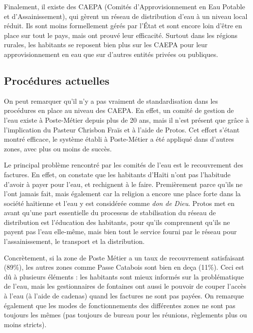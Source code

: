 \documentclass{EPL-master-thesis-covers-FR}
\begin{document}
				Finalement, il existe des CAEPA (Comités d’Approvisionnement en Eau Potable et d'Assainissement), qui gèrent un réseau de distribution d'eau à un niveau local réduit. Ils sont moins formellement gérés par l'\'Etat et sont encore loin d'être en place sur tout le pays, mais ont prouvé leur efficacité. Surtout dans les régions rurales, les habitants se reposent bien plus sur les CAEPA pour leur approvisionnement en eau que sur d'autres entités privées ou publiques.



			\subsection*{Procédures actuelles}
				\label{sec:procedures_actuelles}

				On peut remarquer qu'il n'y a pas vraiment de standardisation dans les procédures en place au niveau des CAEPA. En effet, un comité de gestion de l'eau existe à Poste-Métier depuis plus de 20 ans, mais il n'est présent que grâce à l'implication du Pasteur Chrisbon Fraïs et à l'aide de Protos. Cet effort s'étant montré efficace, le système établi à Poste-Métier a été appliqué dans d'autres zones, avec plus ou moins de succès.

				Le principal problème rencontré par les comités de l'eau est le recouvrement des factures. En effet, on constate que les habitants d'Haïti n'ont pas l'habitude d'avoir à payer pour l'eau, et rechignent à le faire. Premièrement parce qu'ils ne l'ont jamais fait, mais également car la religion a encore une place forte dans la société haïtienne et l'eau y est considérée comme \emph{don de Dieu}. Protos met en avant qu'une part essentielle du processus de stabilisation du réseau de distribution est l'éducation des habitants, pour qu'ils comprennent qu'ils ne payent pas l'eau elle-même, mais bien tout le service fourni par le réseau pour l'assainissement, le transport et la distribution.

				Concrètement, si la zone de Poste Métier a un taux de recouvrement satisfaisant (89\%), les autres zones comme Passe Catabois sont bien en deça (11\%). Ceci est dû à plusieurs éléments : les habitants sont mieux informés sur la problématique de l'eau, mais les gestionnaires de fontaines ont aussi le pouvoir de couper l'accès à l'eau (à l'aide de cadenas) quand les factures ne sont pas payées. On remarque également que les modes de fonctionnements des différentes zones ne sont pas toujours les mêmes (pas toujours de bureau pour les réunions, règlements plus ou moins stricts).
\end{document}
